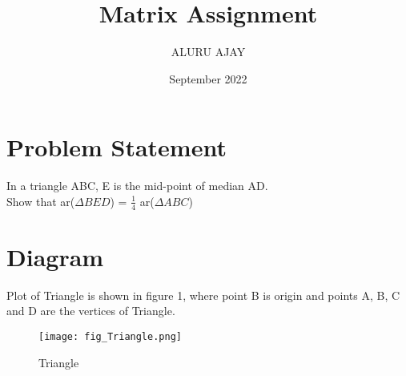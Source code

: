 \documentclass[journal,10pt,twocolumn]{article}
\title{\textbf{Matrix Assignment}}
\author{ALURU AJAY}
\date{September 2022}
\begin{document}
\maketitle

\section{Problem Statement}
In a triangle ABC, E is the mid-point of median AD.
\vspace{0.3cm}\\ 
Show that ar($\Delta BED$) = $\frac{1}{4}$ ar($\Delta ABC$)

\section{Diagram}
Plot of Triangle is shown in figure 1, where point B is origin and points A, B, C and D are the vertices of Triangle.
\begin{figure}[h]
\texttt{[image: fig\_Triangle.png]}
\caption{Triangle}
\label{fig:Triangle}
\end{figure}
\end{document}
